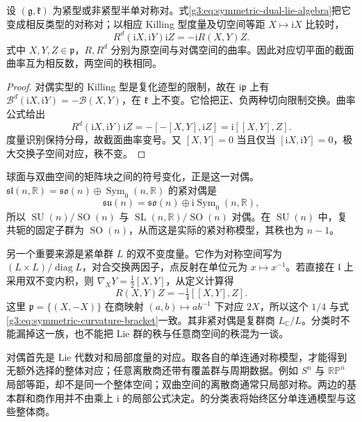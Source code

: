 \begin{proposition}\label{g3:prop:symmetric-duality-curvature}
	设 \((\mathfrak g,\mathfrak k)\) 为紧型或非紧型半单对称对。式\eqref{g3:eq:symmetric-dual-lie-algebra}把它变成相反类型的对称对；以相应 Killing 型度量及切空间等距 \(X\mapsto\mathrm iX\) 比较时，
	\[
		R^d(\mathrm iX,\mathrm iY)\mathrm iZ=-\mathrm iR(X,Y)Z.
	\]
	式中 \(X,Y,Z\in\mathfrak p\)，\(R,R^d\) 分别为原空间与对偶空间的曲率。因此对应切平面的截面曲率互为相反数，两空间的秩相同。
\end{proposition}
\begin{proof}
	对偶实型的 Killing 型是复化迹型的限制，故在 \(\mathrm i\mathfrak p\) 上有 \(\mathcal B^d(\mathrm iX,\mathrm iY)=-\mathcal B(X,Y)\)，在 \(\mathfrak k\) 上不变。它恰把正、负两种切向限制交换。曲率公式给出
	\[
		R^d(\mathrm iX,\mathrm iY)\mathrm iZ
		=-[-[X,Y],\mathrm iZ]=\mathrm i[[X,Y],Z].
	\]
	度量识别保持分母，故截面曲率变号。又 \([X,Y]=0\) 当且仅当 \([\mathrm iX,\mathrm iY]=0\)，极大交换子空间对应，秩不变。
\end{proof}

球面与双曲空间的矩阵块之间的符号变化，正是这一对偶。\(\mathfrak{sl}(n,\mathbb R)=\mathfrak{so}(n)\oplus\operatorname{Sym}_0(n,\mathbb R)\) 的紧对偶是
\[
	\mathfrak{su}(n)=\mathfrak{so}(n)\oplus\mathrm i\operatorname{Sym}_0(n,\mathbb R),
\]
所以 \(\operatorname{SU}(n)/\operatorname{SO}(n)\) 与 \(\operatorname{SL}(n,\mathbb R)/\operatorname{SO}(n)\) 对偶。在 \(\operatorname{SU}(n)\) 中，复共轭的固定子群为 \(\operatorname{SO}(n)\)，从而这是实际的紧对称模型，其秩也为 \(n-1\)。

\ProseParagraphBreak

另一个重要来源是紧单群 \(L\) 的双不变度量。它作为对称空间写为 \((L\times L)/\operatorname{diag}L\)，对合交换两因子，点反射在单位元为 \(x\mapsto x^{-1}\)。若直接在 \(\mathfrak l\) 上采用双不变内积，则 \(\nabla_XY=\tfrac12[X,Y]\)，从定义计算得
\[
	R(X,Y)Z=-\tfrac14[[X,Y],Z].
\]
这里 \(\mathfrak p=\{(X,-X)\}\) 在商映射 \((a,b)\mapsto ab^{-1}\) 下对应 \(2X\)，所以这个 \(1/4\) 与式\eqref{g3:eq:symmetric-curvature-bracket}一致。其非紧对偶是复群商 \(L_{\mathbb C}/L\)。分类时不能漏掉这一族，也不能把 Lie 群的秩与任意商空间的秩混为一谈。

\ProseParagraphBreak

对偶首先是 Lie 代数对和局部度量的对应。取各自的单连通对称模型，才能得到无额外选择的整体对应；任意离散商还带有覆盖群与周期数据。例如 \(S^n\) 与 \(\mathbb{RP}^n\) 局部等距，却不是同一个整体空间；双曲空间的离散商通常只局部对称。两边的基本群和商作用并不由乘上 \(\mathrm i\) 的局部公式决定。的分类表将始终区分单连通模型与这些整体商。

